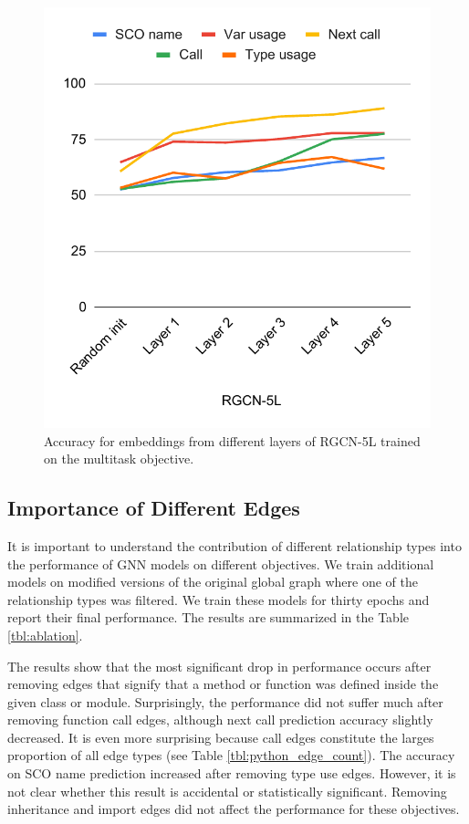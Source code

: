 \documentclass[a4paper,twoside]{article}
\begin{document}
\begin{figure}[]
    \centering
    \includegraphics[width=\columnwidth]{rgcn-5l.pdf}
    \caption{Accuracy for embeddings from different layers of RGCN-5L trained on the multitask objective.}\label{fig:rgcn_layers_5}
\end{figure}

\subsection{Importance of Different Edges}

It is important to understand the contribution of different relationship types into the performance of GNN models on different objectives. We train additional models on modified versions of the original global graph where one of the relationship types was filtered. We train these models for thirty epochs and report their final performance. The results are summarized in the Table \ref{tbl:ablation}.

The results show that the most significant drop in performance occurs after removing edges that signify that a method or function was defined inside the given class or module. Surprisingly, the performance did not suffer much after removing function call edges, although next call prediction accuracy slightly decreased. It is even more surprising because call edges constitute the larges proportion of all edge types (see Table \ref{tbl:python_edge_count}). The accuracy on SCO name prediction increased after removing type use edges. However, it is not clear whether this result is accidental or statistically significant. Removing inheritance and import edges did not affect the performance for these objectives. 
\end{document}
